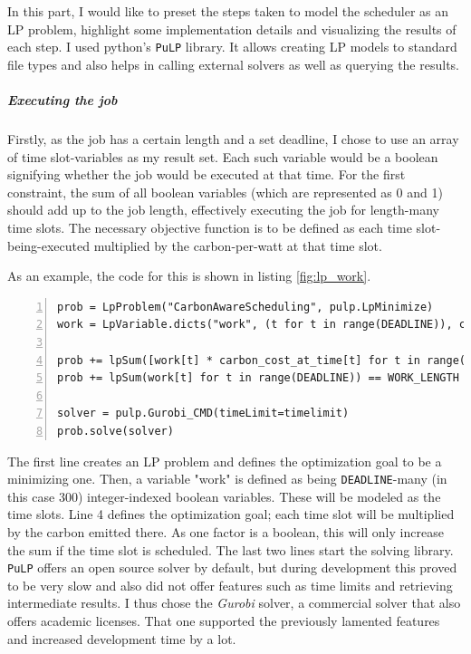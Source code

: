 In this part, I would like to preset the steps taken to model the scheduler as an LP problem, highlight some implementation details and visualizing the results of each step.
I used python's \verb|PuLP| library.
It allows creating LP models to standard file types and also helps in calling external solvers as well as querying the results.

\subparagraph{Executing the job}

Firstly, as the job has a certain length and a set deadline, I chose to use an array of time slot-variables as my result set. Each such variable would be a boolean signifying whether the job would be executed at that time.
For the first constraint, the sum of all boolean variables (which are represented as 0 and 1) should add up to the job length, effectively executing the job for length-many time slots.
The necessary objective function is to be defined as each time slot-being-executed multiplied by the carbon-per-watt at that time slot.

As an example, the code for this is shown in listing \ref{fig:lp_work}.

\begin{lstlisting}[frame=single, numbers=left, caption={LP Implementation for basic scheduling}, label={list:lp_work}, basicstyle=\ttfamily]
prob = LpProblem("CarbonAwareScheduling", pulp.LpMinimize)
work = LpVariable.dicts("work", (t for t in range(DEADLINE)), cat="Binary")

prob += lpSum([work[t] * carbon_cost_at_time[t] for t in range(DEADLINE)]) 
prob += lpSum(work[t] for t in range(DEADLINE)) == WORK_LENGTH

solver = pulp.Gurobi_CMD(timeLimit=timelimit)
prob.solve(solver)
\end{lstlisting}

The first line creates an LP problem and defines the optimization goal to be a minimizing one. 
Then, a variable "work" is defined as being \verb|DEADLINE|-many (in this case 300) integer-indexed boolean variables. 
These will be modeled as the time slots.
Line 4 defines the optimization goal; each time slot will be multiplied by the carbon emitted there. As one factor is a boolean, this will only increase the sum if the time slot is scheduled. 
The last two lines start the solving library. 
\verb|PuLP| offers an open source solver by default, but during development this proved to be very slow and also did not offer features such as time limits and retrieving intermediate results.
I thus chose the \emph{Gurobi} solver, a commercial solver that also offers academic licenses. 
That one supported the previously lamented features and increased development time by a lot. 

